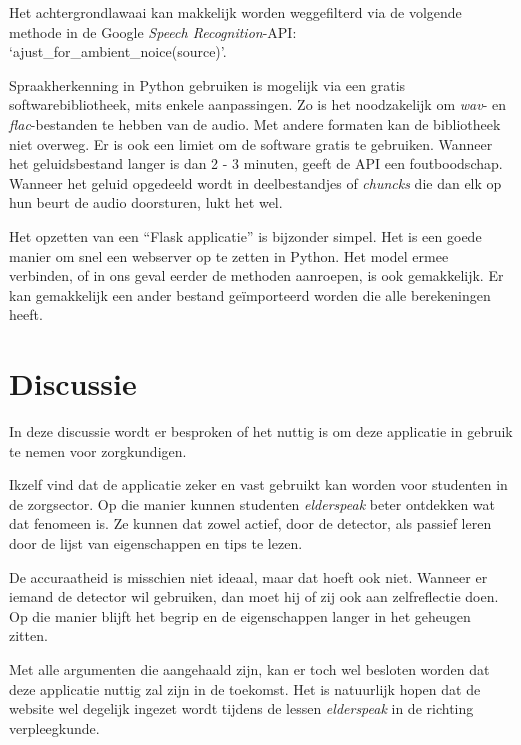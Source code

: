 Het achtergrondlawaai kan makkelijk worden weggefilterd via de volgende methode in de Google \textit{Speech Recognition}-API: `ajust\_for\_ambient\_noice(source)'.

Spraakherkenning in Python gebruiken is mogelijk via een gratis softwarebibliotheek, mits enkele aanpassingen. Zo is het noodzakelijk om \textit{wav}- en \textit{flac}-bestanden te hebben van de audio. Met andere formaten kan de bibliotheek niet overweg. Er is ook een limiet om de software gratis te gebruiken. Wanneer het geluidsbestand langer is dan 2 - 3 minuten, geeft de API een foutboodschap. Wanneer het geluid opgedeeld wordt in deelbestandjes of \textit{chuncks} die dan elk op hun beurt de audio doorsturen, lukt het wel.

Het opzetten van een ``Flask applicatie'' is bijzonder simpel. Het is een goede manier om snel een webserver op te zetten in Python. Het model ermee verbinden, of in ons geval eerder de methoden aanroepen, is ook gemakkelijk. Er kan gemakkelijk een ander bestand geïmporteerd worden die alle berekeningen heeft.

\section{Discussie}
In deze discussie wordt er besproken of het nuttig is om deze applicatie in gebruik te nemen voor zorgkundigen.

Ikzelf vind dat de applicatie zeker en vast gebruikt kan worden voor studenten in de zorgsector. Op die manier kunnen studenten \textit{elderspeak} beter ontdekken wat dat fenomeen is. Ze kunnen dat zowel actief, door de detector, als passief leren door de lijst van eigenschappen en tips te lezen.

De accuraatheid is misschien niet ideaal, maar dat hoeft ook niet. Wanneer er iemand de detector wil gebruiken, dan moet hij of zij ook aan zelfreflectie doen. Op die manier blijft het begrip en de eigenschappen langer in het geheugen zitten.

Met alle argumenten die aangehaald zijn, kan er toch wel besloten worden dat deze applicatie nuttig zal zijn in de toekomst. Het is natuurlijk hopen dat de website wel degelijk ingezet wordt tijdens de lessen \textit{elderspeak} in de richting verpleegkunde.